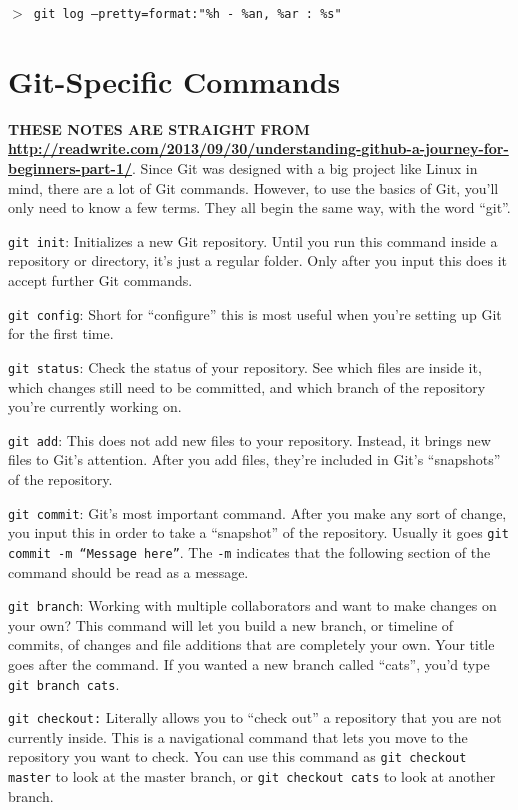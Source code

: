 \documentclass[11pt,a4paper]{article}
\begin{document}
   \noindent
   {\tt $>$ git log --pretty=format:"\%h - \%an, \%ar : \%s"} \\


\newpage
\section{Git-Specific Commands}
{\bf THESE NOTES ARE STRAIGHT FROM\\
\href{http://readwrite.com/2013/09/30/understanding-github-a-journey-for-beginners-part-1/}{http://readwrite.com/2013/09/30/understanding-github-a-journey-for-beginners-part-1/}}.
Since Git was designed with a big project like Linux in mind, there
are a lot of Git commands. However, to use the basics of Git, you’ll
only need to know a few terms. They all begin the same way, with the
word ``git''.

{\tt git init}: Initializes a new Git repository. Until you run this
command inside a repository or directory, it’s just a regular
folder. Only after you input this does it accept further Git commands.

{\tt git config}: Short for ``configure'' this is most useful when
you’re setting up Git for the first time.

{\tt git status}: Check the status of your repository. See which files
are inside it, which changes still need to be committed, and which
branch of the repository you’re currently working on.

{\tt git add}: This does not add new files to your
repository. Instead, it brings new files to Git’s attention. After you
add files, they’re included in Git's ``snapshots'' of the repository.

{\tt git commit}: Git’s most important command. After you make any
sort of change, you input this in order to take a ``snapshot'' of the
repository. Usually it goes {\tt git commit -m ``Message here''}.  The
{\tt -m} indicates that the following section of the command should be
read as a message.

{\tt git branch}: Working with multiple collaborators and want to make
changes on your own? This command will let you build a new branch, or
timeline of commits, of changes and file additions that are completely
your own. Your title goes after the command. If you wanted a new
branch called ``cats'', you'd type {\tt git branch cats}.

{\tt git checkout:} Literally allows you to ``check out'' a repository
that you are not currently inside. This is a navigational command that
lets you move to the repository you want to check. You can use this
command as {\tt git checkout master} to look at the master branch, or
{\tt git checkout cats} to look at another branch.
\end{document}
